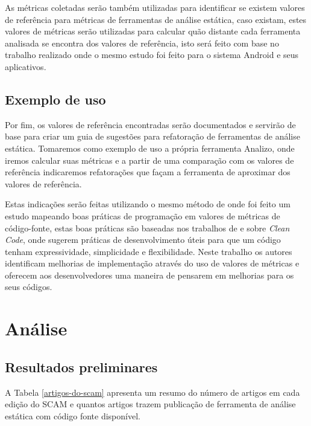 \documentclass[qual, classic, a4paper]{ufbathesis}
\begin{document}
As métricas coletadas serão também utilizadas para identificar se existem
valores de referência para métricas de ferramentas de análise estática, caso
existam, estes valores de métricas serão utilizadas para calcular quão
distante cada ferramenta analisada se encontra dos valores de referência, isto
será feito com base no trabalho realizado  onde o
mesmo estudo foi feito para o sistema Android e seus aplicativos.

\section{Exemplo de uso}

Por fim, os valores de referência encontradas serão documentados e servirão de
base para criar um guia de sugestões para refatoração de ferramentas de
análise estática. Tomaremos como exemplo de uso a própria ferramenta Analizo,
onde iremos calcular suas métricas e a partir de uma comparação com os
valores de referência indicaremos refatorações que façam a ferramenta de
aproximar dos valores de referência.

Estas indicações serão feitas utilizando o mesmo método de
 onde foi feito um estudo mapeando boas práticas de
programação em valores de métricas de código-fonte, estas boas práticas são
baseadas nos trabalhos de \cite{Martin2012} e \cite{Beck2007} sobre {\it Clean
Code}, onde sugerem práticas de desenvolvimento úteis para que um código
tenham expressividade, simplicidade e flexibilidade. Neste trabalho os autores
identificam melhorias de implementação através do uso de valores de métricas e
oferecem aos desenvolvedores uma maneira de pensarem em melhorias para os seus
códigos.

\chapter{Análise}

\section{Resultados preliminares}\label{resultados}

A Tabela \ref{artigos-do-scam} apresenta um resumo do número de artigos em
cada edição do SCAM e quantos artigos trazem publicação de ferramenta de análise
estática com código fonte disponível.
\end{document}
